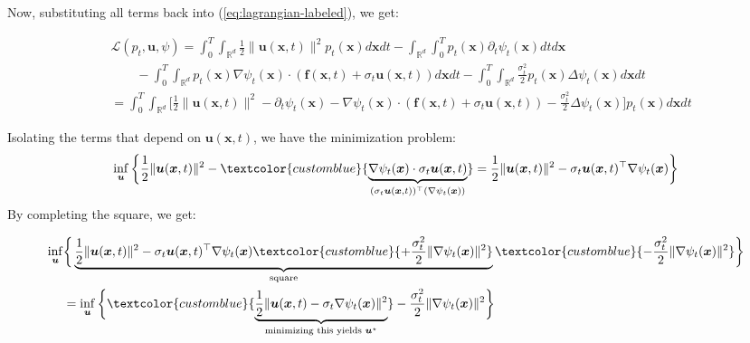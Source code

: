 \documentclass{article}
\newcommand{\bluetext}[1]{\textcolor{customblue}{#1}}
\begin{document}
Now, substituting all terms back into (\ref{eq:lagrangian-labeled}), we get:
\begin{small}
\begin{align}
    &\mathcal{L}(p_t,\boldsymbol{u},\psi)=\int_0^T\int_{\mathbb{R}^d}\frac{1}{2}\|\boldsymbol{u}(\boldsymbol{x},t)\|^2p_t(\boldsymbol{x})d\boldsymbol{x}dt-\int_{\mathbb{R}^d}\int_0^Tp_t(\boldsymbol{x})\partial_t\psi_t(\boldsymbol{x})dtd\boldsymbol{x}\nonumber\\
    &\quad \quad-\int_0^T\int_{\mathbb{R}^d}p_t(\boldsymbol{x})\nabla \psi_t (\boldsymbol{x})\cdot (\boldsymbol{f}(\boldsymbol{x},t) +\sigma_t\boldsymbol{u}(\boldsymbol{x},t)) d\boldsymbol{x}dt-\int_0^T\int_{\mathbb{R}^d}\frac{\sigma_t^2}{2}p_t(\boldsymbol{x})\Delta\psi_t (\boldsymbol{x})d\boldsymbol{x}dt\nonumber\\
    &=\int_0^T\int_{\mathbb{R}^d}\bigg[\frac{1}{2}\|\boldsymbol{u}(\boldsymbol{x},t)\|^2 -\partial_t\psi_t(\boldsymbol{x})-\nabla \psi_t (\boldsymbol{x})\cdot (\boldsymbol{f}(\boldsymbol{x},t) +\sigma_t\boldsymbol{u}(\boldsymbol{x},t))-\frac{\sigma_t^2}{2}\Delta \psi_t (\boldsymbol{x})\bigg]p_t(\boldsymbol{x})d\boldsymbol{x}dt\label{eq:lagrangian-simple}
\end{align}
\end{small}
Isolating the terms that depend on $\boldsymbol{u}(\boldsymbol{x},t)$, we have the minimization problem:
\begin{align}
    \inf_{\boldsymbol{u}}\bigg\{\frac{1}{2}\|\boldsymbol{u}(\boldsymbol{x},t)\|^2 -\bluetext{\underbrace{\nabla \psi_t (\boldsymbol{x})\cdot\sigma_t\boldsymbol{u}(\boldsymbol{x},t)}_{(\sigma_t\boldsymbol{u}(\boldsymbol{x},t))^\top(\nabla \psi_t (\boldsymbol{x}))}}=\frac{1}{2}\|\boldsymbol{u}(\boldsymbol{x},t)\|^2 -\sigma_t\boldsymbol{u}(\boldsymbol{x},t)^\top \nabla \psi_t (\boldsymbol{x})\bigg\}
\end{align}
By completing the square, we get:
\begin{small}
\begin{align}
    \inf_{\boldsymbol{u}}&\bigg\{\underbrace{\frac{1}{2}\|\boldsymbol{u}(\boldsymbol{x},t)\|^2 -\sigma_t\boldsymbol{u}(\boldsymbol{x},t)^\top \nabla \psi_t (\boldsymbol{x})\bluetext{+\frac{\sigma_t^2}{2}\|\nabla \psi_t (\boldsymbol{x})\|^2 }}_{\text{square}}\bluetext{-\frac{\sigma_t^2}{2}\| \nabla \psi_t (\boldsymbol{x})\|^2}\bigg\}\nonumber\\
    &=\inf_{\boldsymbol{u}}\bigg\{\bluetext{\underbrace{\frac{1}{2}\|\boldsymbol{u}(\boldsymbol{x},t)-\sigma_t \nabla \psi_t (\boldsymbol{x})\|^2 }_{\text{minimizing this yields }\boldsymbol{u}^\star}}-\frac{\sigma_t^2}{2}\| \nabla \psi_t (\boldsymbol{x})\|^2\bigg\}
\end{align}
\end{small}
\end{document}
